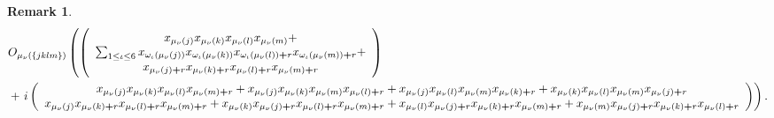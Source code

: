 \documentclass[aps,preprint]{revtex4}%
\newtheorem{remark}[theorem]{Remark}
\begin{document}
\begin{remark}%
\begin{align}
&  O_{\mu_{\nu}\left(  \left\{  jklm\right\}  \right)  }\left(  \left(
\overset{}{%
\begin{array}
[c]{c}%
x_{\mu_{\nu}\left(  j\right)  }x_{\mu_{\nu}\left(  k\right)  }x_{\mu_{\nu
}\left(  l\right)  }x_{\mu_{\nu}\left(  m\right)  }+\\
\sum_{1\leq\iota\leq6}x_{\omega_{\iota}\left(  \mu_{\nu}\left(  j\right)
\right)  }x_{\omega_{\iota}\left(  \mu_{\nu}\left(  k\right)  \right)
}x_{\omega_{\iota}\left(  \mu_{\nu}\left(  l\right)  \right)  \boldsymbol{+}%
r}x_{\omega_{\iota}\left(  \mu_{\nu}\left(  m\right)  \right)  \boldsymbol{+}%
r}+\\
x_{\mu_{\nu}\left(  j\right)  \boldsymbol{+}r}x_{\mu_{\nu}\left(  k\right)
\boldsymbol{+}r}x_{\mu_{\nu}\left(  l\right)  \boldsymbol{+}r}x_{\mu_{\nu
}\left(  m\right)  \boldsymbol{+}r}%
\end{array}
}\right)  \right. \\
&  +\left.  i\left(
\begin{array}
[c]{c}%
x_{\mu_{\nu}\left(  j\right)  }x_{\mu_{\nu}\left(  k\right)  }x_{\mu_{\nu
}\left(  l\right)  }x_{\mu_{\nu}\left(  m\right)  \boldsymbol{+}r}+x_{\mu
_{\nu}\left(  j\right)  }x_{\mu_{\nu}\left(  k\right)  }x_{\mu_{\nu}\left(
m\right)  }x_{\mu_{\nu}\left(  l\right)  \boldsymbol{+}r}+x_{\mu_{\nu}\left(
j\right)  }x_{\mu_{\nu}\left(  l\right)  }x_{\mu_{\nu}\left(  m\right)
}x_{\mu_{\nu}\left(  k\right)  \boldsymbol{+}r}+x_{\mu_{\nu}\left(  k\right)
}x_{\mu_{\nu}\left(  l\right)  }x_{\mu_{\nu}\left(  m\right)  }x_{\mu_{\nu
}\left(  j\right)  \boldsymbol{+}r}\\
\overset{}{x_{\mu_{\nu}\left(  j\right)  }x_{\mu_{\nu}\left(  k\right)
\boldsymbol{+}r}x_{\mu_{\nu}\left(  l\right)  \boldsymbol{+}r}x_{\mu_{\nu
}\left(  m\right)  \boldsymbol{+}r}+x_{\mu_{\nu}\left(  k\right)  }x_{\mu
_{\nu}\left(  j\right)  \boldsymbol{+}r}x_{\mu_{\nu}\left(  l\right)
\boldsymbol{+}r}x_{\mu_{\nu}\left(  m\right)  \boldsymbol{+}r}+x_{\mu_{\nu
}\left(  l\right)  }x_{\mu_{\nu}\left(  j\right)  \boldsymbol{+}r}x_{\mu_{\nu
}\left(  k\right)  \boldsymbol{+}r}x_{\mu_{\nu}\left(  m\right)
\boldsymbol{+}r}+x_{\mu_{\nu}\left(  m\right)  }x_{\mu_{\nu}\left(  j\right)
\boldsymbol{+}r}x_{\mu_{\nu}\left(  k\right)  \boldsymbol{+}r}x_{\mu_{\nu
}\left(  l\right)  \boldsymbol{+}r}}%
\end{array}
\right)  \right)  .
\end{align}

\end{remark}
\end{document}
